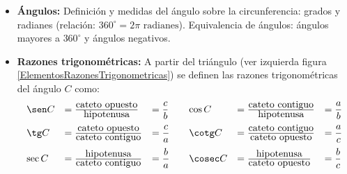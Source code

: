 \begin{itemize}
\item 
{\bf Ángulos:} Definición y medidas del ángulo sobre la circunferencia: grados y radianes (relación: $360^\circ = 2\pi\mbox{ radianes}$). Equivalencia de ángulos: ángulos mayores a $360^\circ$ y ángulos negativos.
\item
{\bf Razones trigonométricas:}
A partir del triángulo (ver izquierda  figura \ref{ElementosRazonesTrigonometricas}) se definen las razones trigonom\'etricas del \'angulo $C$ como:
$$\begin{array}{llllll}
\displaystyle\sen C & = \frac{\mbox{cateto opuesto}}{\mbox{hipotenusa}}
& = \dfrac{c}{b}     \quad &
\displaystyle\cos C & = \frac{\mbox{cateto contiguo}}{\mbox{hipotenusa}}
& = \dfrac{a}{b}     \\
\noalign{\medskip}
\displaystyle\tg  C & = \frac{\mbox{cateto opuesto}}{\mbox{cateto contiguo}} & = \dfrac{c}{a}      \quad &
\displaystyle\cotg C & = \frac{\mbox{cateto contiguo}}{\mbox{cateto opuesto}} & = \dfrac{a}{c}      \\
\noalign{\medskip}
\displaystyle\sec C & = \frac{\mbox{hipotenusa}}{\mbox{cateto contiguo}}
& = \dfrac{b}{a}     \quad &
\displaystyle\cosec C &= \frac{\mbox{hipotenusa}}{\mbox{cateto opuesto}}
& = \dfrac{b}{c}
\end{array}$$


\end{itemize}
